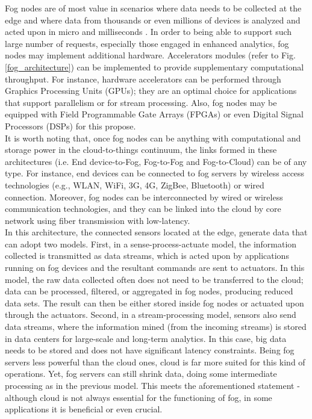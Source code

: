 Fog nodes are of most value in scenarios where data needs to be collected at the edge and where data from thousands or even millions of devices is analyzed and acted upon in micro and milliseconds \cite{openfog2017openfog}. In order to being able to support such large number of requests, especially those engaged in enhanced analytics, fog nodes may implement additional hardware. Accelerators modules (refer to Fig. \ref{fog_architecture}) can be implemented to provide supplementary computational throughput. For instance, hardware accelerators can be performed through Graphics Processing Units (GPUs); they are an optimal choice for applications that support parallelism or for stream processing. Also, fog nodes may be equipped with Field Programmable Gate Arrays (FPGAs) or even Digital Signal Processors (DSPs) for this propose.\\[6pt]
It is worth noting that, once fog nodes can be anything with computational and storage power in the cloud-to-things continuum, the links formed in these architectures (i.e. End device-to-Fog, Fog-to-Fog and Fog-to-Cloud) can be of any type. For instance, end devices can be connected to fog servers by wireless access technologies (e.g., WLAN, WiFi, 3G, 4G, ZigBee, Bluetooth) or wired connection. Moreover, fog nodes can be interconnected by wired or wireless communication technologies, and they can be linked into the cloud by core network using fiber transmission with low-latency.\\[6pt]
In this architecture, the connected sensors located at the edge, generate data that can adopt two models. First, in a sense-process-actuate model, the information collected is transmitted as data streams, which is acted upon by applications running on fog devices and the resultant commands are sent to actuators. In this model, the raw data collected often does not need to be transferred to the cloud; data can be processed, filtered, or aggregated in fog nodes, producing reduced data sets. The result can then be either stored inside fog nodes or actuated upon through the actuators. Second, in a stream-processing model, sensors also send data streams, where the information mined (from the incoming streams) is stored in data centers for large-scale and long-term analytics. In this case, big data needs to be stored and does not have significant latency constraints. Being fog servers less powerful than the cloud ones, cloud is far more suited for this kind of operations. Yet, fog servers can still shrink data, doing some intermediate processing as in the previous model. This meets the aforementioned statement - although cloud is not always essential for the functioning of fog, in some applications it is beneficial or even crucial.\\[6pt]

